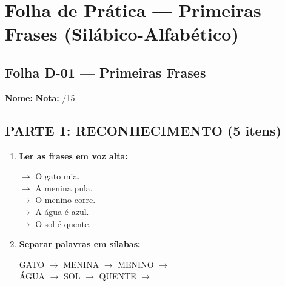 
\section{Folha de Prática --- Primeiras Frases (Silábico-Alfabético)}


\subsection{Folha D-01 --- Primeiras Frases}

\begin{exercicio}

\noindent\textbf{Nome:} \underline{\hspace{4cm}} \quad \textbf{Nota:} \underline{\hspace{1cm}}/15

\subsection*{PARTE 1: RECONHECIMENTO (5 itens)}

\begin{enumerate}
  \item \textbf{Ler as frases em voz alta:}
  \begin{center}
  $\rightarrow$ O gato mia. \\
  $\rightarrow$ A menina pula. \\
  $\rightarrow$ O menino corre. \\
  $\rightarrow$ A água é azul. \\
  $\rightarrow$ O sol é quente.
  \end{center}

  \item \textbf{Separar palavras em sílabas:}
  \begin{center}
  GATO $\rightarrow$ \underline{\hspace{1.5cm}} \quad MENINA $\rightarrow$ \underline{\hspace{1.5cm}} \quad MENINO $\rightarrow$ \underline{\hspace{1.5cm}} \\
  ÁGUA $\rightarrow$ \underline{\hspace{1.5cm}} \quad SOL $\rightarrow$ \underline{\hspace{1.5cm}} \quad QUENTE $\rightarrow$ \underline{\hspace{1.5cm}}
  \end{center}


\end{enumerate}
\end{exercicio}
